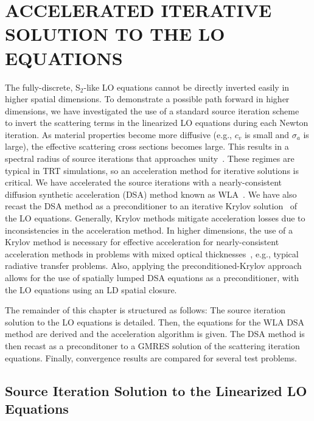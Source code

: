 
\chapter{\uppercase {Accelerated Iterative Solution to the LO Equations}}

The fully-discrete, S$_2$-like LO equations 
cannot be directly inverted easily in higher spatial dimensions.  
To demonstrate a possible path forward in
higher dimensions, we have investigated the use of a standard
source iteration scheme~\cite{lewis} to invert the scattering terms in the linearized LO
equations during each Newton iteration.  As
material properties become more diffusive (e.g., $c_v$ is small and $\sigma_a$ is
large), the effective scattering cross sections becomes large.  This results in a spectral radius of source iterations that approaches
unity~\cite{morel_ldtrt}.  These regimes are typical in TRT simulations, so an
acceleration method for iterative solutions is critical. 
We have accelerated the source iterations with a nearly-consistent diffusion synthetic acceleration
(DSA) method known as WLA~\cite{wla,wla_thesis}. We have also recast the DSA method as a preconditioner to an iterative
Krylov solution~\cite{larson_morel_sn} of the LO equations.  Generally, Krylov
methods mitigate acceleration losses due to inconsistencies in the acceleration
method.  In higher dimensions, the use of a Krylov method is necessary for effective
acceleration for nearly-consistent acceleration methods in problems with
mixed optical thicknesses~\cite{larson_morel_sn}, e.g., typical radiative transfer
problems.  Also, applying the preconditioned-Krylov approach allows for the use of
spatially lumped DSA equations as a preconditioner, with the LO equations using an LD
spatial closure.

The remainder of this chapter is structured as follows:  The source
iteration solution to the LO equations is detailed.  Then, the equations for the WLA DSA
method are derived and the acceleration algorithm is given.  The DSA method is then recast
as a preconditoner to a GMRES solution of the scattering iteration equations.  Finally,
convergence results are compared for several test problems.

\section{Source Iteration Solution to the Linearized LO Equations}
\label{sec:si}

